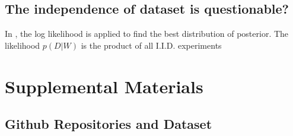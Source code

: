 \documentclass{article}
\newcommand{\beginsupplement}{%
        \setcounter{table}{0}
        \renewcommand{\thetable}{S\arabic{table}}%
        \setcounter{figure}{0}
        \renewcommand{\thefigure}{S\arabic{figure}}%
        \setcounter{section}{0}
        \renewcommand{\thesection}{S\arabic{section}}%
        \setcounter{equation}{0}
        \renewcommand{\theequation}{S\arabic{equation}}%
     }
\begin{document}
\subsection{The independence of dataset is questionable?}

In \cite{chandra2021bayesian}, the log likelihood is applied to find the best distribution of posterior. The likelihood $p(D|W)$ is the product of all I.I.D. experiments




\beginsupplement
\section{Supplemental Materials}

\subsection{Github Repositories and Dataset}
\end{document}
